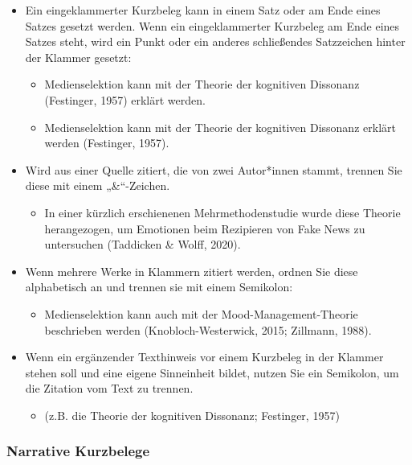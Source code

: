 \documentclass[
  letterpaper,
  DIV=11]{scrreprt}
\providecommand{\tightlist}{%
  \setlength{\itemsep}{0pt}\setlength{\parskip}{0pt}}\usepackage{longtable,booktabs,array}
\begin{document}
\begin{itemize}
\item
  Ein eingeklammerter Kurzbeleg kann in einem Satz oder am Ende eines
  Satzes gesetzt werden. Wenn ein eingeklammerter Kurzbeleg am Ende
  eines Satzes steht, wird ein Punkt oder ein anderes schließendes
  Satzzeichen hinter der Klammer gesetzt:

  \begin{itemize}
  \item
    Medienselektion kann mit der Theorie der kognitiven Dissonanz
    (Festinger, 1957) erklärt werden.
  \item
    Medienselektion kann mit der Theorie der kognitiven Dissonanz
    erklärt werden (Festinger, 1957).
  \end{itemize}
\item
  Wird aus einer Quelle zitiert, die von zwei Autor*innen stammt,
  trennen Sie diese mit einem „\&``-Zeichen.

  \begin{itemize}
  \tightlist
  \item
    In einer kürzlich erschienenen Mehrmethodenstudie wurde diese
    Theorie herangezogen, um Emotionen beim Rezipieren von Fake News zu
    untersuchen (Taddicken \& Wolff, 2020).
  \end{itemize}
\item
  Wenn mehrere Werke in Klammern zitiert werden, ordnen Sie diese
  alphabetisch an und trennen sie mit einem Semikolon:

  \begin{itemize}
  \tightlist
  \item
    Medienselektion kann auch mit der Mood-Management-Theorie
    beschrieben werden (Knobloch-Westerwick, 2015; Zillmann, 1988).
  \end{itemize}
\item
  Wenn ein ergänzender Texthinweis vor einem Kurzbeleg in der Klammer
  stehen soll und eine eigene Sinneinheit bildet, nutzen Sie ein
  Semikolon, um die Zitation vom Text zu trennen.

  \begin{itemize}
  \tightlist
  \item
    (z.B. die Theorie der kognitiven Dissonanz; Festinger, 1957)
  \end{itemize}
\end{itemize}

\subsubsection{Narrative Kurzbelege}\label{narrative-kurzbelege}
\end{document}
